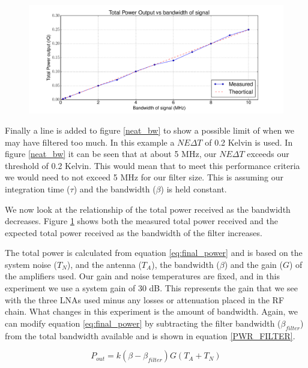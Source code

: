 {\begin{figure}[h!tb] \centering
\includegraphics[width=\textwidth]{Experiments/Exp5/combined_plot.pdf}
\label{power_bw}
\end{figure}

Finally a line is added to figure \ref{neat_bw} to show a possible limit of when we may have filtered too much.  In this example a $NE\Delta T$ of 0.2 Kelvin is used.  In figure \ref{neat_bw} it can be seen that at about 5 MHz, our $NE\Delta T$ exceeds our threshold of 0.2 Kelvin.  This would mean that to meet this performance criteria we would need to not exceed 5 MHz for our filter size.  This is assuming our integration time ($\tau$) and the bandwidth ($\beta$) is held constant. 

We now look at the relationship of the total power received as the bandwidth decreases.  Figure \ref{power_bw} shows both the measured total power received and the expected total power received as the bandwidth of the filter increases.

The total power is calculated from equation \ref{eq:final_power} and is based on the system noise ($T_N$), and the antenna ($T_A$), the bandwidth ($\beta$) and the gain ($G$) of the amplifiers used.  Our gain and noise temperatures are fixed, and in this experiment we use a system gain of 30 dB.  This represents the gain that we see with the three LNAs used minus any losses or attenuation placed in the RF chain.  What changes in this experiment is the amount of bandwidth.  Again, we can modify equation \ref{eq:final_power} by subtracting the filter bandwidth ($\beta_{filter}$) from the total bandwidth available and is shown in equation \ref{PWR_FILTER}.

\begin{equation}\label{PWR_FILTER}
P_{out}=k (\beta - \beta_{filter})G(T_{A}+T_{N})
\end{equation}

}
